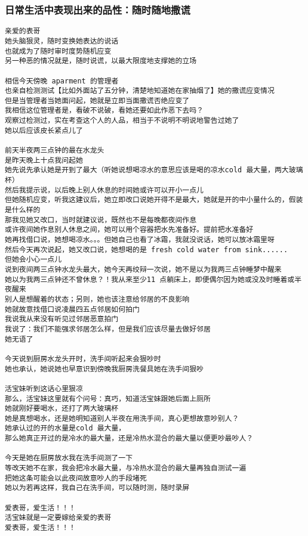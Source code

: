 \documentclass[9pt, b5paper]{article}
\begin{document}
\subsubsection{日常生活中表现出来的品性：随时随地撒谎}
\label{sec-3-2-4}
\begin{verbatim}
亲爱的表哥
她头脑狠灵，随时变换她表达的说话
也就成为了随时审时度势随机应变
另一种恶的情况就是，随时说谎，以最大限度地支撑她的立场

相信今天傍晚 aparment 的管理者
也亲自检测测试【比如外面站了五分钟，清楚地知道她在家抽烟了】她的撒谎应变情况
但是当管理者当她面问起，她就是立即当面撒谎否绝应变了
我相信这位管理者是，看破不说破，看她还要如此作恶下去吗？
观察过检测过，实在考查这个人的人品，相当于不说明不明说地警告过她了
她以后应该皮长紧点儿了

前天半夜两三点钟的最在水龙头
是昨天晚上十点我问起她
她先说先承认她是开到了最大（听她说想喝凉水的意思应该是喝的凉水cold 最大量，两大玻璃杯）
然后我提示说，以后晚上别人休息的时间她或许可以开小一点儿
但她随机应变，听我这建议后，她立即改口说她开得不是最大，她就是开的中小量什么的，假装是什么样的
那我见她又改口，当时就建议说，既然也不是每晚都夜间作息
或许夜间她作息别人休息之间，她可以用个容器把水先准备好。提前把水准备好
她再找借口说，她想喝凉水。。。但她自己也看了冰霜，我就没说话，她可以放冰霜里呀
然后今天再次说起，她又改口说，她想喝的是 fresh cold water from sink......
但她会小心一点儿
说到夜间两三点钟水龙头最大，她今天再绞辩一次说，她不是以为我两三点钟睡梦中醒来
她以为我两三点钟还不曾休息？！我从来至少11 点躺床上，即便偶尔因为她或没及时睡着或半夜醒来
别人是想醒着的状态；另则，她也该注意给邻居的不良影响
她就故意找借口说凌晨四五点邻居如何拍门
我说我从来没有听见过邻居恶意拍门
我说了：我们不能强求邻居怎么样，但是我们应该尽量去做好邻居 
她无语了

今天说到厨房水龙头开时，洗手间听起来会狠吵时
她也承认，她说她也早意识到傍晚我厨房洗餐具她在洗手间狠吵

活宝妹听到这话心里狠凉 
那么，活宝妹这里就有个问号：真巧，知道活宝妹跟她后面上厕所
她就刚好要喝水，还打了两大玻璃杯
她是真想喝水，还是她明知道别人半夜在用洗手间，真心更想故意吵别人？
她承认过的开的水量是cold 最大量，
那么她真正开过的是冷水的最大量，还是冷热水混合的最大量以便更吵最吵人？

今天是她在厨房放水我在洗手间测了一下
等改天她不在家，我会把冷水最大量，与冷热水混合的最大量再独自测试一遍
把她这条可能会以此夜间故意吵人的手段堵死
她以为若再这样，我自己在洗手间，可以随时测，随时录屏

爱表哥，爱生活！！！
活宝妹就是一定要嫁给亲爱的表哥
爱表哥，爱生活！！！
\end{verbatim}
\end{document}
